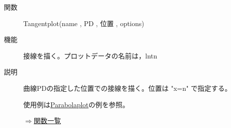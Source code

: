 \documentclass[papersize,a4paper,12pt,uplatex]{jsarticle}
\begin{document}
\begin{description}
\begin{center}

\end{center}

\vspace{\baselineskip}
\hypertarget{tangentplot}{}
\item[関数]Tangentplot(name , PD , 位置 , options)
\item[機能]接線を描く。プロットデータの名前は，lntn
\item[説明]曲線PDの指定した位置での接線を描く。位置は "x=n" で指定する。

使用例は\hyperlink{parabolaplot}{Parabolaplot}の例を参照。

\begin{flushright}\hyperlink{functionlist}{$\Rightarrow$関数一覧}\end{flushright}

\end{description}
\end{document}
